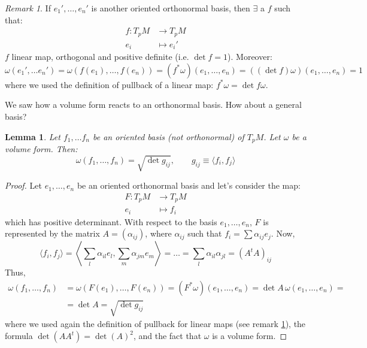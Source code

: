 \documentclass[a4paper,11pt,titlepage, article, oneside]{memoir}
\numberwithin{equation}{section}
\newtheorem{lemma}[theorem]{Lemma}
\theoremstyle{definition}
\theoremstyle{remark}
\newtheorem{remark}[theorem]{Remark}
\begin{document}
\begin{remarkbox}\begin{remark} \label{diffbasisrem}
If $e_1', \ldots, e_n'$ is another oriented orthonormal basis, then $\exists$ a $f$ such that:
\begin{align*}
f \colon T_pM &\rightarrow T_p M \\
e_i &\mapsto e_i'
\end{align*}
$f$ linear map, orthogonal and positive definite (i.e. $\det f = 1$). Moreover:
$$\omega(e_1', \ldots e_n') = \omega(f(e_1), \ldots, f(e_n)) = (f^* \omega) (e_1, \ldots, e_n) = ((\det f) \omega)(e_1, \ldots, e_n) =1$$
where we used the definition of pullback of a linear map: $f^* \omega = \det f \omega$.
\end{remark}\end{remarkbox}
We saw how a volume form reacts to an orthonormal basis. How about a general basis?

\begin{lemma}
Let $f_1, \ldots f_n$ be an oriented basis (not orthonormal) of $T_p M$. Let $\omega$ be a volume form. Then:
\begin{equation}
\omega(f_1, \ldots, f_n)=\sqrt{\det g_{ij}}, \qquad g_{ij} \equiv \langle f_i, f_j \rangle 
\end{equation}
\end{lemma}
\begin{proof}
Let $e_1, \ldots, e_n$ be an oriented orthonormal basis and let's consider the map:
\begin{align*}
F \colon T_pM &\rightarrow T_p M \\
e_i &\mapsto f_i
\end{align*}
which has positive determinant. With respect to the basis $e_1, \ldots, e_n$, $F$ is represented by the matrix $A=(\alpha_{ij})$, where $\alpha_{ij}$ such that $f_i = \sum \alpha_{ij} e_j$. Now,
$$\langle f_i, f_j \rangle = \left \langle \sum\limits_l \alpha_{il} e_l, \sum\limits_m \alpha_{jm}e_m \right \rangle = \ldots= \sum\limits_l \alpha_{il}\alpha_{jl} = \left( A^t A \right )_{ij}$$
Thus,
\begin{align*}
\omega(f_1, \ldots, f_n) &= \omega(F(e_1), \ldots, F(e_n)) = (F^* \omega)(e_1, \ldots, e_n)= \det A \, \omega(e_1, \ldots, e_n) =\\
&= \det A = \sqrt{\det g_{ij}}
\end{align*}
where we used again the definition of pullback for linear maps (see remark \ref{diffbasisrem}), the formula $\det(A A^t) = \det(A)^2$, and the fact that $\omega$ is a volume form.
\end{proof}
\end{document}
